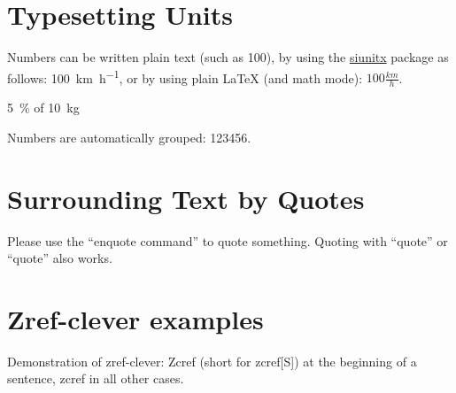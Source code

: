 
\section{Typesetting Units}

\begin{ltgexample}
Numbers can be written plain text (such as 100), by using the \href{https://ctan.org/pkg/siunitx}{siunitx} package as follows:
\SI{100}{\km\per\hour},
or by using plain \LaTeX{} (and math mode):
$100 \frac{\mathit{km}}{h}$.
\end{ltgexample}

\begin{ltgexample}
\SI{5}{\percent} of \SI{10}{kg}
\end{ltgexample}

\begin{ltgexample}
Numbers are automatically grouped: \num{123456}.
\end{ltgexample}

\section{Surrounding Text by Quotes}

\begin{ltgexample}
Please use the \enquote{enquote command} to quote something.
Quoting with "`quote"' or ``quote'' also works.

\end{ltgexample}

\section{Zref-clever examples}
\label{sec:ex:cref}

Demonstration of zref-clever: Zcref (short for zcref[S]) at the beginning of a sentence, zcref in all other cases.

